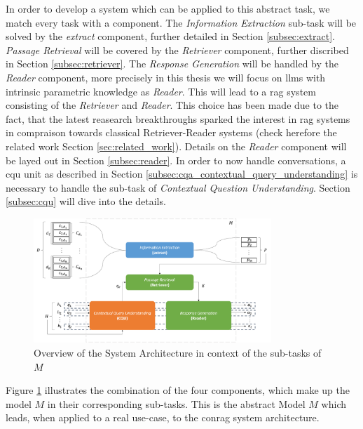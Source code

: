 In order to develop a system which can be applied to this abstract task, we match every task with a component. The \textit{Information Extraction} sub-task will be solved by the \textit{extract} component, further detailed in Section \ref{subsec:extract}. \textit{Passage Retrieval} will be covered by the \textit{Retriever} component, further discribed in Section \ref{subsec:retriever}. The \textit{Response Generation} will be handled by the \textit{Reader} component, more precisely in this thesis we will focus on \gls{llm}s with intrinsic parametric knowledge as \textit{Reader}. This will lead to a \gls{rag} system consisting of the \textit{Retriever} and \textit{Reader}. This choice has been made due to the fact, that the latest reasearch breakthroughs sparked the interest in \gls{rag} systems in compraison towards classical Retriever-Reader systems (check herefore the related work Section \ref{sec:related_work}). Details on the \textit{Reader} component will be layed out in Section \ref{subsec:reader}. In order to now handle conversations, a \gls{cqu} unit as described in Section \ref{subsec:cqa_contextual_query_understanding} is necessary to handle the sub-task of \textit{Contextual Question Understanding}. Section \ref{subsec:cqu} will dive into the details.

\begin{figure}
    \centering
    \includegraphics[width=0.8\textwidth]{Grafiken/conrag_konzeptionell.png}
    \caption{Overview of the System Architecture in context of the sub-tasks of $M$}
    \label{fig:conrag_concept_system_architecture}
\end{figure}

Figure \ref{fig:conrag_concept_system_architecture} illustrates the combination of the four components, which make up the model $M$ in their corresponding sub-tasks. This is the abstract Model $M$ which leads, when applied to a real use-case, to the \gls{conrag} system architecture.

